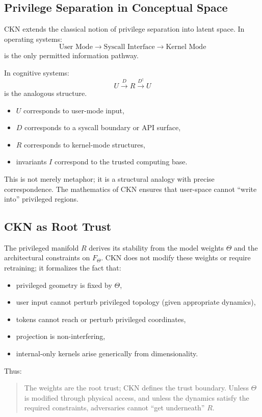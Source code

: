 \documentclass[11pt,a4paper]{article}
\begin{document}
\subsection{Privilege Separation in Conceptual Space}

CKN extends the classical notion of privilege separation into latent space. In operating systems:
\[
\text{User Mode} \to \text{Syscall Interface} \to \text{Kernel Mode}
\]
is the only permitted information pathway.

In cognitive systems:
\[
U \xrightarrow{D} R \xrightarrow{D^\dagger} U
\]
is the analogous structure.

\begin{itemize}
    \item $U$ corresponds to user-mode input,
    \item $D$ corresponds to a syscall boundary or API surface,
    \item $R$ corresponds to kernel-mode structures,
    \item invariants $I$ correspond to the trusted computing base.
\end{itemize}

This is not merely metaphor; it is a structural analogy with precise correspondence. The mathematics of CKN ensures that user-space cannot ``write into'' privileged regions.

\subsection{CKN as Root Trust}

The privileged manifold $R$ derives its stability from the model weights $\Theta$ and the architectural constraints on $F_\Theta$. CKN does not modify these weights or require retraining; it formalizes the fact that:
\begin{itemize}
    \item privileged geometry is fixed by $\Theta$,
    \item user input cannot perturb privileged topology (given appropriate dynamics),
    \item tokens cannot reach or perturb privileged coordinates,
    \item projection is non-interfering,
    \item internal-only kernels arise generically from dimensionality.
\end{itemize}

Thus:
\begin{quote}
The weights are the root trust; CKN defines the trust boundary. Unless $\Theta$ is modified through physical access, and unless the dynamics satisfy the required constraints, adversaries cannot ``get underneath'' $R$.
\end{quote}
\end{document}
